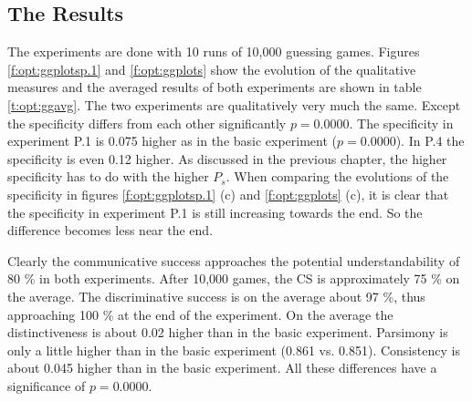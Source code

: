 \subsection{The Results}

The experiments are done with 10 runs of 10,000 guessing games. Figures \ref{f:opt:ggplotsp.1} and \ref{f:opt:ggplots} show the evolution of the qualitative measures and the averaged results of both experiments are shown in table \ref{t:opt:ggavg}. The two experiments are qualitatively very much the same. Except the specificity differs from each other significantly $p=0.0000$. The specificity in experiment P.1 is 0.075 higher as in the basic experiment ($p=0.0000$). In P.4 the specificity is even 0.12 higher. As discussed in the previous chapter, the higher specificity has to do with the higher $P_s$. When comparing the evolutions of the specificity in figures \ref{f:opt:ggplotsp.1} (c) and \ref{f:opt:ggplots} (c), it is clear that the specificity in experiment P.1 is still increasing towards the end. So the difference becomes less near the end.

Clearly the communicative success approaches the potential understandability of 80 \% in both experiments. After 10,000 games, the CS is approximately 75 \% on the average. The discriminative success is on the average about 97 \%, thus approaching 100 \% at the end of the experiment. On the average the distinctiveness is about 0.02 higher than in the basic experiment. Parsimony is only a little higher than in the basic experiment (0.861 vs. 0.851). Consistency is about 0.045 higher than in the basic experiment. All these differences have a significance of $p=0.0000$.

